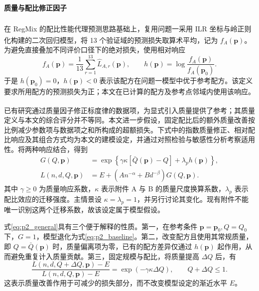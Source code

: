 \documentclass[bwprint]{gmcmthesis}
\numberwithin{equation}{section}
\numberwithin{figure}{section}
\numberwithin{table}{section}
\begin{document}
        \paragraph{质量与配比修正因子}
        在 RegMix 的配比性能代理预测思路基础上\textsuperscript{\cite{liu2025regmix}}，复用问题一采用 ILR 坐标与岭正则化构建的二次回归模型\textsuperscript{\cite{egozcue2003ilr,hoerl1970ridge}}，将 13 个验证域的预测损失取算术平均，记为 $f_A(\bm p)$。为避免直接叠加不同评价口径下的绝对损失，使用相对响应
        \begin{equation}
         f_A(\bm p)=\frac1{13}\sum_{r=1}^{13}\widehat L_{A,r}(\bm p),
         \qquad h(\bm p)=\log\frac{f_A(\bm p)}{f_A(\bm p_0)}.
         \label{eq:p2_mix}
        \end{equation}
        于是 $h(\bm p_0)=0$，$h(\bm p)<0$ 表示该配方在问题一模型中优于参考配方。该定义要求所用配方的预测损失为正；本文在已计算的配方及参考点邻域内使用该响应。
        
        已有研究通过质量因子修正标度律的数据项\textsuperscript{\cite{subramanyam2026quality}}，为显式引入质量提供了参考；其质量定义与本文的综合评分并不等同。本文进一步假设，固定配比后的额外质量改善按比例减少参数项与数据项之和所构成的超额损失。下式中的指数质量修正、相对配比响应及其组合方式均为本文的建模设定，并通过对照检验与敏感性分析考察适用性。将两种响应结合，得到
        \begin{equation}
         \begin{aligned}
         G(Q,\bm p)&=\exp\!\left\{\gamma\kappa[\bar Q(\bm p)-Q]+\lambda_p h(\bm p)\right\},\\
         L(n,d,Q,\bm p)&=E+\left(A n^{-\alpha}+B d^{-\beta}\right)G(Q,\bm p).
         \end{aligned}
         \label{eq:p2_general}
        \end{equation}
        其中 $\gamma\geq0$ 为质量响应系数，$\kappa$ 表示附件 A 与 B 的质量尺度换算系数，$\lambda_p$ 表示配比效应的迁移强度。主情景设 $\kappa=\lambda_p=1$，并另行讨论其变化。现有附件不能唯一识别这两个迁移系数，故该设定属于模型假设。
        
        式\eqref{eq:p2_general}具有三个便于解释的性质。第一，在参考条件 $\bm p=\bm p_0,Q=Q_0$ 下，$G=1$，模型退化为式\eqref{eq:p2_baseline}。第二，改变配方且使用其常规质量，即 $Q=\bar Q(\bm p)$ 时，质量偏离项为零，已有的配方差异仅通过 $h(\bm p)$ 起作用，从而避免重复计入质量贡献。第三，固定规模与配比，将质量提高 $\Delta Q$ 后，有
        \begin{equation}
         \frac{L(n,d,Q+\Delta Q,\bm p)-E}{L(n,d,Q,\bm p)-E}
         =\exp(-\gamma\kappa\Delta Q),\qquad Q+\Delta Q\leq1.
         \label{eq:p2_qchange}
        \end{equation}
        这表示质量改善作用于可减少的损失部分，而不改变模型设定的渐近水平 $E$。
        
\end{document}
